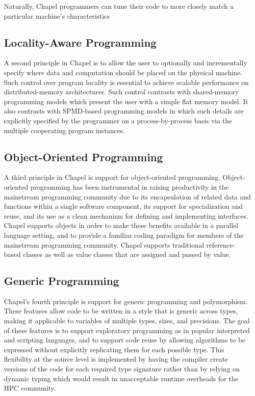 \documentclass[letterpaper]{article}
\begin{document}
Naturally, Chapel programmers can tune their code to more closely match a particular machine’s characteristics

\subsection{Locality-Aware Programming}

A second principle in Chapel is to allow the user to optionally and incrementally specify where data and computation should be placed on the physical machine. Such control over program locality is essential to achieve scalable performance on distributed-memory architectures. Such control contrasts with shared-memory programming models which present the user with a simple flat memory model. It also contrasts with SPMD-based programming models in which such details are explicitly specified by the programmer on a process-by-process basis via the multiple cooperating program instances.

\subsection{Object-Oriented Programming}

A third principle in Chapel is support for object-oriented programming. Object-oriented programming has been instrumental in raising productivity in the mainstream programming community due to its encapsulation of related data and functions within a single software component, its support for specialization and reuse, and its use as a clean mechanism for defining and implementing interfaces. Chapel supports objects in order to make these benefits available in a parallel language setting, and to provide a familiar coding paradigm for members of the mainstream programming community. Chapel supports traditional reference-based classes as well as value classes that are assigned and passed
by value.


\subsection{Generic Programming}

Chapel’s fourth principle is support for generic programming and polymorphism. These features allow code to be written in a style that is generic across types, making it applicable to variables of multiple types, sizes, and precisions. The goal of these features is to support exploratory programming as in popular interpreted and scripting languages, and to support code reuse by allowing algorithms to be expressed without explicitly replicating them for each possible type. This flexibility at the source level is implemented by having the compiler create versions of the code for each required type signature rather than by relying on dynamic typing which would result in unacceptable runtime overheads for the HPC community.
\end{document}
